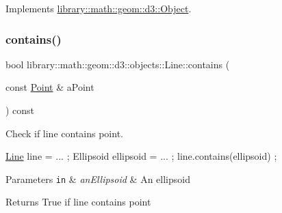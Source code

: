 Implements \hyperlink{classlibrary_1_1math_1_1geom_1_1d3_1_1_object_a1a784c6b359e0eb97cd34fabc42f2f3f}{library\+::math\+::geom\+::d3\+::\+Object}.

\mbox{\label{classlibrary_1_1math_1_1geom_1_1d3_1_1objects_1_1_line_a59b72a3a39134963f5165a03829b17aa}} 
\subsubsection{\texorpdfstring{contains()}{contains()}}
{\footnotesize\ttfamily bool library\+::math\+::geom\+::d3\+::objects\+::\+Line\+::contains (\begin{DoxyParamCaption}\item[{const \hyperlink{classlibrary_1_1math_1_1geom_1_1d3_1_1objects_1_1_point}{Point} \&}]{a\+Point }\end{DoxyParamCaption}) const}



Check if line contains point. 


\begin{DoxyCode}
\hyperlink{classlibrary_1_1math_1_1geom_1_1d3_1_1objects_1_1_line_a762e529453ff9ffa9233fd73737f4692}{Line} line = ... ;
Ellipsoid ellipsoid = ... ;
line.contains(ellipsoid) ;
\end{DoxyCode}



\begin{DoxyParams}[1]{Parameters}
\mbox{\tt in}  & {\em an\+Ellipsoid} & An ellipsoid \\
\hline
\end{DoxyParams}
\begin{DoxyReturn}{Returns}
True if line contains point 
\end{DoxyReturn}
\mbox{\label{classlibrary_1_1math_1_1geom_1_1d3_1_1objects_1_1_line_aa108a53227e4326188fe17a03c55f9cb}} 

